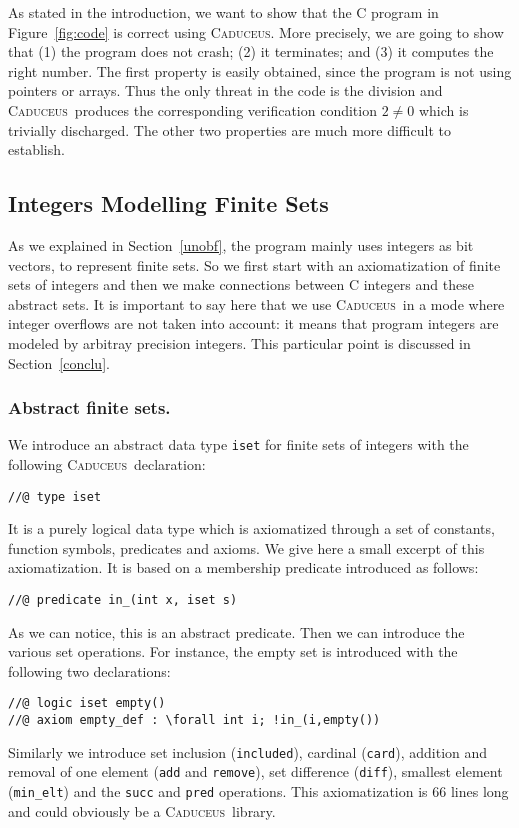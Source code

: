 \documentclass[a4paper]{llncs}
\newcommand{\caduceus}{\textsc{Caduceus}}
\begin{document}
As stated in the introduction, we want to show that the C program in
Figure~\ref{fig:code} is correct using \caduceus. More precisely, we
are going to show that (1) the program does not crash; (2)
it terminates; and (3) it computes the right number.
The first property is easily obtained, since the program is not using
pointers or arrays. Thus the only threat in the code is the division and
\caduceus\ produces the corresponding verification condition $2\not=0$
which is trivially discharged. The other two properties are much more
difficult to establish.

\subsection{Integers Modelling Finite Sets}

As we explained in Section~\ref{unobf}, the program mainly uses integers
as bit vectors, to represent finite sets.  So we first start with an
axiomatization of finite sets of integers and then we make connections
between C integers and these abstract sets. It is important to say
here that we use \caduceus\ in a mode where integer overflows are not
taken into account: it means that program integers are modeled by arbitray
precision integers. This particular point is discussed in
Section~\ref{conclu}. 

\subsubsection{Abstract finite sets.}
We introduce an abstract data type \texttt{iset} for finite sets of
integers with the following \caduceus\ declaration:
\begin{verbatim}
//@ type iset
\end{verbatim}
It is a purely logical data type which is axiomatized through a set of
constants, function symbols, predicates and axioms. We give here a small 
excerpt of this axiomatization. It is based on a
membership predicate  introduced as follows:
\begin{verbatim}
//@ predicate in_(int x, iset s)
\end{verbatim}
As we can notice, this is an abstract predicate. Then we can introduce
the various set operations. For instance, the empty set is introduced
with the following two declarations:
\begin{verbatim}
//@ logic iset empty()
//@ axiom empty_def : \forall int i; !in_(i,empty())
\end{verbatim}
Similarly we introduce set inclusion (\texttt{included}), cardinal
(\texttt{card}), addition and removal
of one element (\texttt{add} and 
\texttt{remove}), set difference (\texttt{diff}), smallest element
(\texttt{min\_elt}) and the \texttt{succ} and \texttt{pred} operations.
This axiomatization is 66 lines long and could obviously be a 
\caduceus\ library.
\end{document}
